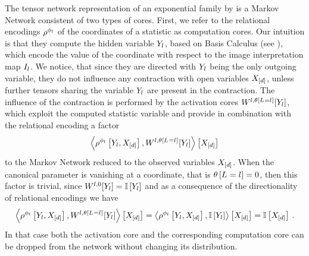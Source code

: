 The tensor network representation of an exponential family by  is a Markov Network consistent of two types of cores.
First, we refer to the relational encodings $\rho^{\phi_{l}}$ of the coordinates of a statistic as computation cores.
Our intuition is that they compute the hidden variable $Y_{l}$, based on Basis Calculus (see ), which encode the value of the coordinate with respect to the image interpretation map $I_{l}$.
We notice, that since they are directed with $Y_{l}$ being the only outgoing variable, they do not influence any contraction with open variables $X_{[d]}$, unless further tensors sharing the variable $Y_{l}$ are present in the contraction.
The influence of the contraction is performed by the activation cores $W^{l,\theta\left[L_{}=l_{}\right]}[Y_{l}]$, which exploit the computed statistic variable and provide in combination with the relational encoding a factor
\begin{align*}
    \left\langle \rho^{\phi_{l}}\left[Y_{l},X_{[d]}\right],W^{l,\theta\left[L_{}=l_{}\right]}[Y_{l}]\right\rangle \left[ X_{[d]} \right]
\end{align*}
to the Markov Network reduced to the observed variables $X_{[d]}$.
When the canonical parameter is vanishing at a coordinate, that is $\theta\left[L_{}=l_{}\right]=0$, then this factor is trivial, since $W^{l,0}[Y_{l}]=\mathbb{I}\left[Y_{l}\right]$ and as a consequence of the directionality of relational encodings we have
\begin{align*}
    \left\langle \rho^{\phi_{l}}\left[Y_{l},X_{[d]}\right],W^{l,\theta\left[L_{}=l_{}\right]}[Y_{l}]\right\rangle \left[ X_{[d]} \right]
    = \left\langle \rho^{\phi_{l}}\left[Y_{l},X_{[d]}\right],\mathbb{I}\left[Y_{l}\right]\right\rangle \left[ X_{[d]} \right]
    = \mathbb{I}\left[X_{[d]}\right] \, .
\end{align*}
In that case both the activation core and the corresponding computation core can be dropped from the network without changing its distribution.

